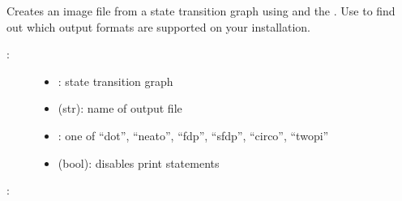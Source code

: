 \documentclass[letterpaper,10pt,english]{sphinxmanual}
\begin{document}
\begin{fulllineitems}
\label{\detokenize{StateTransitionGraphs:PyBoolNet.StateTransitionGraphs.stg2image}}
Creates an image file from a state transition graph using {\hyperref[\detokenize{Installation:installation-graphviz}]{}} and the .
Use  to find out which output formats are supported on your installation.
\begin{description}
\item[{:}] \leavevmode\begin{itemize}
\item {} 
: state transition graph

\item {} 
 (str): name of output file

\item {} 
: one of “dot”, “neato”, “fdp”, “sfdp”, “circo”, “twopi”

\item {} 
 (bool): disables print statements

\end{itemize}

\end{description}

:

\begin{sphinxVerbatim}[commandchars=\\\{\}]
 
  
  
\end{sphinxVerbatim}

\end{fulllineitems}
\end{document}
